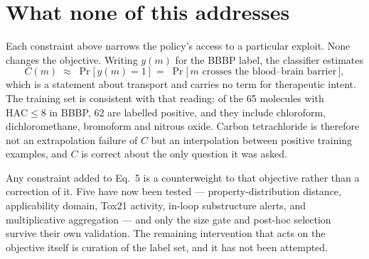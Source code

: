 \documentclass[11pt]{article}
\newcommand{\1}{\mathbb{1}}
\begin{document}
\section{What none of this addresses}
\label{sec:residual}

Each constraint above narrows the policy's access to a particular
exploit. None changes the objective. Writing $y(m)$ for the BBBP label,
the classifier estimates
\begin{equation}
C(m) \;\approx\; \Pr\big[\,y(m) = 1 \,\big]
\;=\; \Pr\big[\,m \text{ crosses the blood--brain barrier}\,\big],
\end{equation}
which is a statement about transport and carries no term for therapeutic
intent. The training set is consistent with that reading: of the 65
molecules with $\mathrm{HAC} \le 8$ in BBBP, 62 are labelled positive, and
they include chloroform, dichloromethane, bromoform and nitrous oxide.
Carbon tetrachloride is therefore not an extrapolation failure of $C$ but
an interpolation between positive training examples, and $C$ is correct
about the only question it was asked.

Any constraint added to Eq.~5 is a counterweight to that objective rather
than a correction of it. Five have now been tested --- property-distribution
distance, applicability domain, Tox21 activity, in-loop substructure
alerts, and multiplicative aggregation --- and only the size gate and
post-hoc selection survive their own validation. The remaining
intervention that acts on the objective itself is curation of the label
set, and it has not been attempted.
\end{document}
